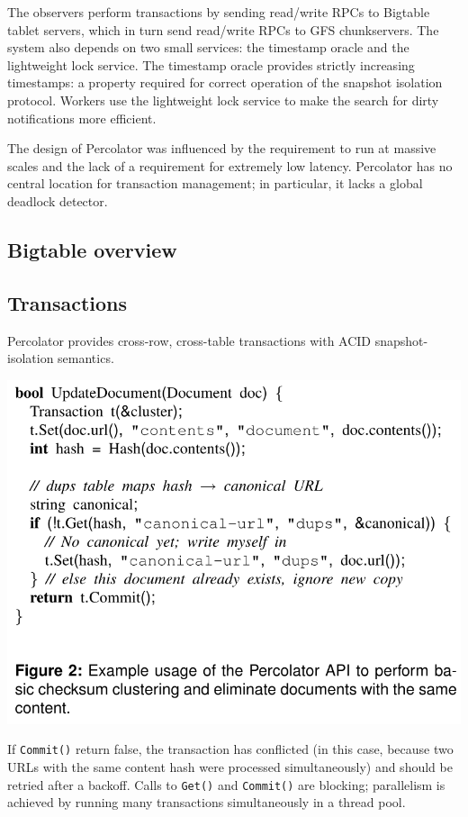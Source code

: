 \documentclass[11pt]{article}
\begin{document}
The observers perform transactions by sending read/write RPCs to Bigtable tablet servers, which in
turn send read/write RPCs to GFS chunkservers. The system also depends on two small services: the
timestamp oracle and the lightweight lock service. The timestamp oracle provides strictly increasing
timestamps: a property required for correct operation of the snapshot isolation protocol. Workers use
the lightweight lock service to make the search for dirty notifications more efficient.

The design of Percolator was influenced by the requirement to run at massive scales and the lack of a
requirement for extremely low latency.  Percolator has no central location for transaction management;
in particular, it lacks a global deadlock detector.
\subsection{Bigtable overview}
\label{sec:org12d3640}
\subsection{Transactions}
\label{sec:org3b5eeb4}
Percolator provides cross-row, cross-table transactions with ACID snapshot-isolation semantics.

\begin{center}
\includegraphics[width=.8\textwidth]{../../images/papers/3.png}
\label{}
\end{center}

If \texttt{Commit()} return false, the transaction has conflicted (in this case, because two URLs with the same
content hash were processed simultaneously) and should be retried after a backoff. Calls to \texttt{Get()} and
\texttt{Commit()} are blocking; parallelism is achieved by running many transactions simultaneously in a thread
pool.
\end{document}
